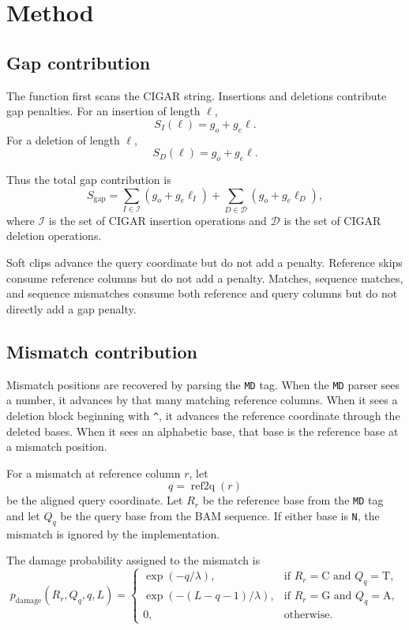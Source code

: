 \documentclass[11pt]{article}
\begin{document}
\section{Method}

\subsection{Gap contribution}

The function first scans the CIGAR string. Insertions and deletions contribute
gap penalties. For an insertion of length $\ell$,
\[
S_I(\ell) = g_o + g_e \ell.
\]
For a deletion of length $\ell$,
\[
S_D(\ell) = g_o + g_e \ell.
\]

Thus the total gap contribution is
\[
S_{\mathrm{gap}}
 =
\sum_{I \in \mathcal{I}} \left(g_o + g_e \ell_I\right)
+
\sum_{D \in \mathcal{D}} \left(g_o + g_e \ell_D\right),
\]
where $\mathcal{I}$ is the set of CIGAR insertion operations and
$\mathcal{D}$ is the set of CIGAR deletion operations.

Soft clips advance the query coordinate but do not add a penalty. Reference
skips consume reference columns but do not add a penalty. Matches, sequence
matches, and sequence mismatches consume both reference and query columns but do
not directly add a gap penalty.

\subsection{Mismatch contribution}

Mismatch positions are recovered by parsing the \texttt{MD} tag. When the
\texttt{MD} parser sees a number, it advances by that many matching reference
columns. When it sees a deletion block beginning with \texttt{\^}, it advances
the reference coordinate through the deleted bases. When it sees an alphabetic
base, that base is the reference base at a mismatch position.

For a mismatch at reference column $r$, let
\[
q = \operatorname{ref2q}(r)
\]
be the aligned query coordinate. Let $R_r$ be the reference base from the
\texttt{MD} tag and let $Q_q$ be the query base from the BAM sequence. If
either base is \texttt{N}, the mismatch is ignored by the implementation.

The damage probability assigned to the mismatch is
\[
p_{\mathrm{damage}}(R_r, Q_q, q, L)
=
\begin{cases}
\exp\left(-q / \lambda\right),
& \text{if } R_r=\mathrm{C} \text{ and } Q_q=\mathrm{T},\\
\exp\left(-(L-q-1) / \lambda\right),
& \text{if } R_r=\mathrm{G} \text{ and } Q_q=\mathrm{A},\\
0,
& \text{otherwise.}
\end{cases}
\]
\end{document}
